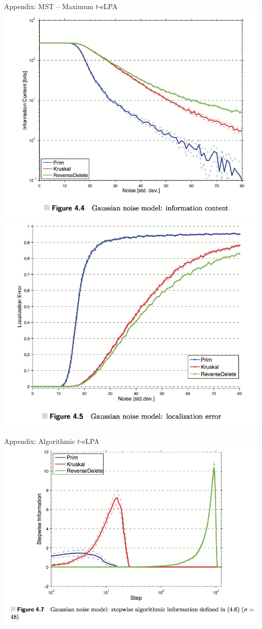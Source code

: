 \documentclass[presentation,12pt]{beamer}
\begin{document}
\begin{frame}{Appendix: MST -- Maximum $t$-eLPA}
  \centering
  \includegraphics[width=.45\textwidth]{mst-noise.png}
  \includegraphics[width=.45\textwidth]{mst-loc-err.png}
\end{frame}

\begin{frame}{Appendix: Algorithmic $t$-eLPA}
  \centering
  \includegraphics[width=.8\textwidth]{mst-elpa.png}
\end{frame}
\end{document}
